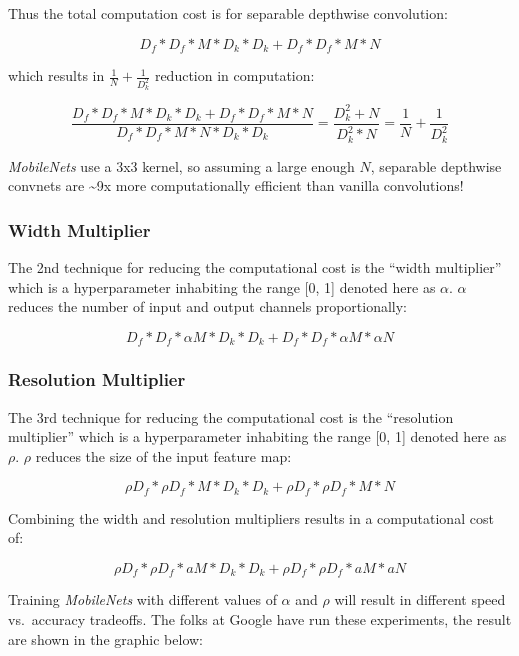 \documentclass[11pt]{article}
\begin{document}
Thus the total computation cost is for separable depthwise convolution:

\[
D_f * D_f * M * D_k * D_k + D_f * D_f * M * N
\]

which results in \(\frac{1}{N} + \frac{1}{D_k^2}\) reduction in
computation:

\[
\frac {D_f * D_f * M * D_k * D_k + D_f * D_f * M * N} {D_f * D_f * M * N * D_k * D_k} = 
\frac {D_k^2 + N} {D_k^2*N} = 
\frac {1}{N} + \frac{1}{D_k^2}
\]

\emph{MobileNets} use a 3x3 kernel, so assuming a large enough \(N\),
separable depthwise convnets are \textasciitilde{}9x more
computationally efficient than vanilla convolutions!

    \hypertarget{width-multiplier}{%
\subsubsection{Width Multiplier}\label{width-multiplier}}

The 2nd technique for reducing the computational cost is the ``width
multiplier'' which is a hyperparameter inhabiting the range {[}0, 1{]}
denoted here as \(\alpha\). \(\alpha\) reduces the number of input and
output channels proportionally:

\[
D_f * D_f * \alpha M * D_k * D_k + D_f * D_f * \alpha M * \alpha N
\]

    \hypertarget{resolution-multiplier}{%
\subsubsection{Resolution Multiplier}\label{resolution-multiplier}}

The 3rd technique for reducing the computational cost is the
``resolution multiplier'' which is a hyperparameter inhabiting the range
{[}0, 1{]} denoted here as \(\rho\). \(\rho\) reduces the size of the
input feature map:

\[
\rho D_f * \rho D_f * M * D_k * D_k + \rho D_f * \rho D_f * M * N
\]

    Combining the width and resolution multipliers results in a
computational cost of:

\[
\rho D_f * \rho D_f * a M * D_k * D_k + \rho D_f * \rho D_f * a M * a N
\]

Training \emph{MobileNets} with different values of \(\alpha\) and
\(\rho\) will result in different speed vs.~accuracy tradeoffs. The
folks at Google have run these experiments, the result are shown in the
graphic below:
\end{document}
